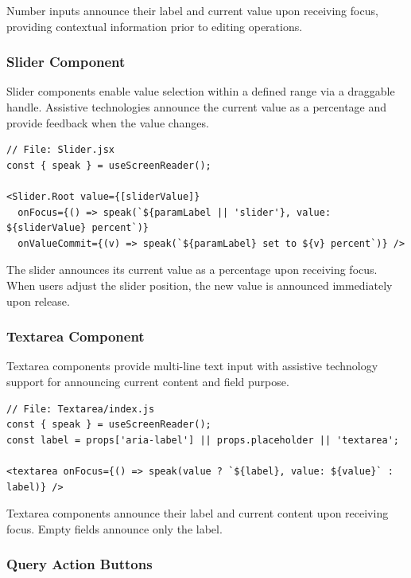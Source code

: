 Number inputs announce their label and current value upon receiving focus, providing contextual information prior to editing operations.

\subsubsection{Slider Component}

Slider components enable value selection within a defined range via a draggable handle. Assistive technologies announce the current value as a percentage and provide feedback when the value changes.

\begin{lstlisting}[caption={Slider with percentage announcements}, label={lst:slider-sr}]
// File: Slider.jsx
const { speak } = useScreenReader();

<Slider.Root value={[sliderValue]}
  onFocus={() => speak(`${paramLabel || 'slider'}, value: ${sliderValue} percent`)}
  onValueCommit={(v) => speak(`${paramLabel} set to ${v} percent`)} />
\end{lstlisting}

The slider announces its current value as a percentage upon receiving focus. When users adjust the slider position, the new value is announced immediately upon release.

\subsubsection{Textarea Component}

Textarea components provide multi-line text input with assistive technology support for announcing current content and field purpose.

\begin{lstlisting}[caption={Textarea with content announcement}, label={lst:textarea-sr}]
// File: Textarea/index.js
const { speak } = useScreenReader();
const label = props['aria-label'] || props.placeholder || 'textarea';

<textarea onFocus={() => speak(value ? `${label}, value: ${value}` : label)} />
\end{lstlisting}

Textarea components announce their label and current content upon receiving focus. Empty fields announce only the label.

\subsubsection{Query Action Buttons}

